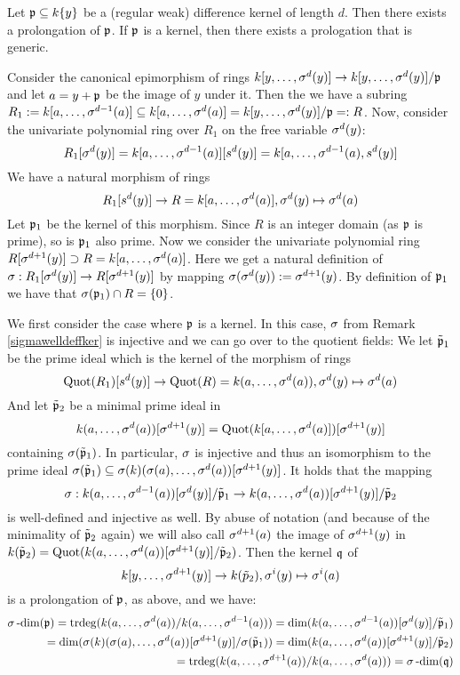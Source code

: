 \begin{prop}\label{genericprol}
Let $\mathfrak{p} \subseteq k\{y\}$ be a (regular weak) difference kernel of length $d$. Then there exists a prolongation of $\mathfrak{p}$. If $\mathfrak{p}$ is a kernel, then there exists a prologation that is generic. 
\begin{bew}
Consider the canonical epimorphism of rings $k[y,\ldots,\sigma^{d}(y)] \rightarrow k[y,\ldots,\sigma^{d}(y)]/\mathfrak{p}$ and let $a = y + \mathfrak{p}$ be the image of $y$ under it. 
Then the we have a subring $R_1: = k[a,\ldots,\sigma^{d-1}(a)] \subseteq k[a,\ldots,\sigma^{d}(a)] = k[y,\ldots,\sigma^{d}(y)]/\mathfrak{p} =: R$. Now, consider the univariate polynomial ring over $R_1$ on the free variable $\sigma^d(y)$:
\[ R_1[\sigma^d(y)] = k[a,\ldots,\sigma^{d-1}(a)][s^d(y)] = k[a,\ldots,\sigma^{d-1}(a),s^d(y)] \]
We have a natural morphism of rings \[ R_1[s^d(y)] \rightarrow R = k[a,\ldots,\sigma^{d}(a)], \sigma^d(y) \mapsto \sigma^d(a) \]
Let $\mathfrak{p}_1$ be the kernel of this morphism. Since $R$ is an integer domain (as $\mathfrak{p}$ is prime), so is $\mathfrak{p}_1$ also prime. 
Now we consider the univariate polynomial ring $R[\sigma^{d+1}(y)] \supset R = k[a,\ldots, \sigma^d(a)]$. Here we get a natural definition of $\sigma: R_1[\sigma^d(y)] \rightarrow R[\sigma^{d+1}(y)]$ by mapping $\sigma( \sigma^d(y))  := \sigma^{d+1}(y)$.
By definition of $\mathfrak{p}_1$ we have that $\sigma(\mathfrak{p}_1) \cap R = \{0\}$. 

We first consider the case where $\mathfrak{p}$ is a kernel. In this case, $\sigma$ from Remark \ref{sigmawelldeffker} is injective and we can go over to the quotient fields:
We let $\tilde {\mathfrak{p}}_1$ be the prime ideal which is the kernel of the morphism of rings
\[ \text{Quot}(R_1)[s^d(y)] \rightarrow \text{Quot}(R) = k(a,\ldots,\sigma^{d}(a)), \sigma^d(y) \mapsto \sigma^d(a) \]
And let $\tilde {\mathfrak{p}}_2$ be a minimal prime ideal in 
\[k(a,\ldots,\sigma^d(a))[\sigma^{d+1}(y)] = \text{Quot}(k[a,\ldots,\sigma^d(a)])[\sigma^{d+1}(y)] \] containing $\sigma(\tilde {\mathfrak{p}}_1)$.
In particular, $\sigma$ is injective and thus an isomorphism to the prime ideal $\sigma(\tilde {\mathfrak{p}}_1) \subseteq \sigma(k)(\sigma(a),\ldots,\sigma^d(a))[\sigma^{d+1}(y)]$.
It holds that the mapping
\[ \sigma: k(a,\ldots,\sigma^{d-1}(a))[\sigma^d(y)]/\tilde {\mathfrak{p}}_1 \rightarrow k(a,\ldots, \sigma^d(a))[\sigma^{d+1}(y)]/\tilde {\mathfrak{p}}_2 \]
is well-defined and injective as well. By abuse of notation (and because of the minimality of $\tilde {\mathfrak{p}}_2$ again) 
we will also call $\sigma^{d+1}(a)$ the image of $\sigma^{d+1}(y)$ in $k(\tilde {\mathfrak{p}}_2) = \text{Quot}(k(a,\ldots, \sigma^d(a))[\sigma^{d+1}(y)]/\tilde {\mathfrak{p}}_2)$.
Then the kernel $\mathfrak{q}$ of \[ k[y,\ldots,\sigma^{d+1}(y)] \rightarrow k(\tilde p_2), \sigma^{i}(y) \mapsto \sigma^{i}(a) \] is a prolongation of $\mathfrak{p}$, as above, and we have:
\begin{align*}
\sigma\operatorname{-dim}(\mathfrak{p}) = \operatorname{trdeg}( k(a,\ldots,\sigma^d(a)) / k(a,\ldots,\sigma^{d-1}(a))) = \text{dim}(k(a,\ldots,\sigma^{d-1}(a))[\sigma^d(y)]/\tilde {\mathfrak{p}}_1) \\ = \text{dim}(\sigma(k)(\sigma(a),\ldots,\sigma^d(a))[\sigma^{d+1}(y)]/\sigma(\tilde {\mathfrak{p}}_1)) 
= \text{dim}(k(a,\ldots,\sigma^{d}(a))[\sigma^{d+1}(y)]/\tilde {\mathfrak{p}}_2) \\ = \operatorname{trdeg}(k(a,\ldots,\sigma^{d+1}(a))/k(a,\ldots,\sigma^d(a))) = \sigma\operatorname{-dim}(\mathfrak{q})
\end{align*}


\end{bew}
\end{prop}
